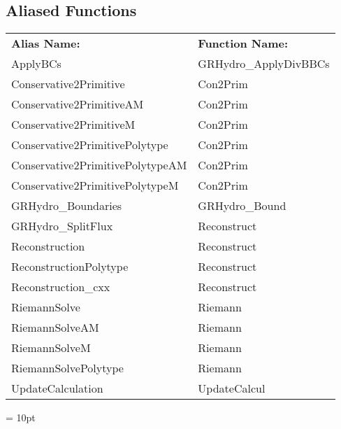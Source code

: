 \documentclass{article}
\begin{document}
\subsection*{Aliased Functions}

\hspace{5mm}

 \begin{tabular*}{160mm}{ll} 

{\bf Alias Name:} ~~~~~~~ & {\bf Function Name:} \\ 
ApplyBCs & GRHydro\_ApplyDivBBCs \\ 
Conservative2Primitive & Con2Prim \\ 
Conservative2PrimitiveAM & Con2Prim \\ 
Conservative2PrimitiveM & Con2Prim \\ 
Conservative2PrimitivePolytype & Con2Prim \\ 
Conservative2PrimitivePolytypeAM & Con2Prim \\ 
Conservative2PrimitivePolytypeM & Con2Prim \\ 
GRHydro\_Boundaries & GRHydro\_Bound \\ 
GRHydro\_SplitFlux & Reconstruct \\ 
Reconstruction & Reconstruct \\ 
ReconstructionPolytype & Reconstruct \\ 
Reconstruction\_cxx & Reconstruct \\ 
RiemannSolve & Riemann \\ 
RiemannSolveAM & Riemann \\ 
RiemannSolveM & Riemann \\ 
RiemannSolvePolytype & Riemann \\ 
UpdateCalculation & UpdateCalcul \\ 
\end{tabular*} 



\vspace{5mm}\parskip = 10pt 
\end{document}
